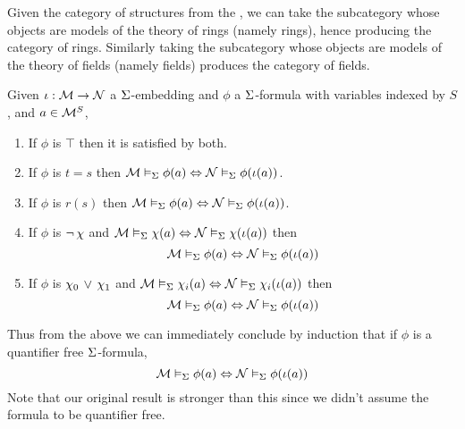 \begin{eg}
    Given the category of structures from the 
    , 
    we can take the subcategory whose objects are models 
    of the theory of rings (namely rings), 
    hence producing the category of rings.
    Similarly taking the subcategory whose objects are models of the 
    theory of fields (namely fields) produces the category of fields.
\end{eg}

\begin{prop}
    Given $\iota : \mathcal{M} \to \mathcal{N}$ a $\Sigma$-embedding and
    $\phi$ a $\Sigma$-formula with variables indexed by $S$,
    and $a \in \mathcal{M}^S$,
    \begin{enumerate}
        \item If $\phi$ is $\top$ then it is satisfied by both.
        \item If $\phi$ is $t = s$ then 
            $\mathcal{M} \vDash_{\Sigma} \phi(a)  \Leftrightarrow \mathcal{N} \vDash_{\Sigma} \phi(\iota(a))$.
        \item If $\phi$ is $r(s)$ then 
            $\mathcal{M} \vDash_{\Sigma} \phi(a)  \Leftrightarrow \mathcal{N} \vDash_{\Sigma} \phi(\iota(a))$.
        \item If $\phi$ is $\neg\, \chi$ and 
            $\mathcal{M} \vDash_{\Sigma} \chi(a)  \Leftrightarrow \mathcal{N} \vDash_{\Sigma} \chi(\iota(a))$
            then \[\mathcal{M} \vDash_{\Sigma} \phi(a)  \Leftrightarrow \mathcal{N} \vDash_{\Sigma} \phi(\iota(a))\]
        \item If $\phi$ is $\chi_0 \, \lor \, \chi_1$ and 
            $\mathcal{M} \vDash_{\Sigma} \chi_i (a)  \Leftrightarrow \mathcal{N} \vDash_{\Sigma} \chi_i (\iota(a))$
            then \[\mathcal{M} \vDash_{\Sigma} \phi(a)  \Leftrightarrow \mathcal{N} \vDash_{\Sigma} \phi(\iota(a))\]
    \end{enumerate}
    Thus from the above we can immediately conclude by induction
    that if $\phi$ is a quantifier free $\Sigma$-formula, 
    \[\mathcal{M} \vDash_{\Sigma} \phi(a)  \Leftrightarrow \mathcal{N} \vDash_{\Sigma} \phi(\iota(a))\]
    Note that our original result is stronger than this since we didn't
    assume the formula to be quantifier free.
\end{prop}
